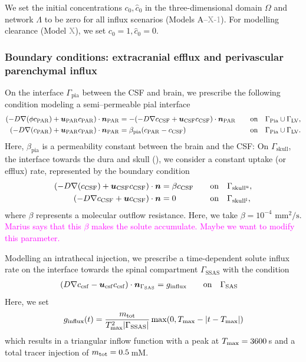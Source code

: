 \documentclass[fleqn,10pt]{wlscirep}
\newcommand{\mer}[1]{\textcolor{magenta}{#1}}
\newcommand{\draft}[1]{\textcolor{gray}{#1}}
\newcommand{\pia}{\Gamma_{\rm{Pia}}}
\newcommand{\spinal}{\Gamma_{\rm SAS}}
\begin{document}
We set the initial concentrations $c_0, \hat{c}_0$ in the three-dimensional domain $\Omega$ and network $\Lambda$ to be zero for all influx scenarios (Models A--\draft{X-1}). For modelling clearance (Model \draft{X}), we set $c_0 = 1, \hat{c}_0 = 0$.

\subsubsection*{Boundary conditions: extracranial efflux and perivascular parenchymal influx}
On the interface $\Gamma_{\mathrm{pia}}$ between the CSF and brain, we prescribe the following condition modeling a semi--permeable pial interface 
\begin{alignat}{2}
(-D \nabla (\phi c_{\rm{PAR}}) + \bm u_{\rm{PAR}} c_{\rm{PAR} }) \cdot \bm{n}_{\rm{PAR}} &= - (- D \nabla c_{\rm{CSF}} + \bm u_{\rm{CSF}} c_{\rm{CSF}} ) \cdot \bm{n}_{\rm{PAR}} &&  \quad  \mathrm{on} \quad \pia \cup \Gamma_{\mathrm{LV}} ,  \\  
(-D \nabla ( c_{\rm{PAR}}) + \bm u_{\rm{PAR}} c_{\rm{PAR} }) \cdot \bm{n}_{\rm{PAR}} & = \beta_{\rm{pia}} (c_{\rm PAR} - c_{\mathrm{CSF}}) &&  \quad  \mathrm{on} \quad  \pia \cup \Gamma_{\mathrm{LV}} .  
\end{alignat} 
Here, $\beta_{\mathrm{pia}}$ is a permeability constant between the brain and the CSF: On $\Gamma_{\mathrm{skull}}$, the interface towards the dura and skull (), we consider a constant uptake (or efflux) rate, represented by the boundary condition 
\begin{alignat}{2}
(- D \nabla ( c_{\mathrm{CSF}}) + \bm u_{\mathrm{CSF}} c_{\mathrm{CSF}}) \cdot \bm{n}   & = \beta c_{\mathrm{CSF}}  && \quad \mathrm{on} \quad \Gamma_{\mathrm{skull}^{\rm u}},\\ 
(-D \nabla c_{\rm CSF} + \bm u c_{\rm CSF}) \cdot \bm{n} & =  0   &&  \quad  \mathrm{on} \quad \Gamma_{\rm skull^{l}} , 
\end{alignat}
where $\beta$ represents a molecular outflow resistance. Here, we take $\beta = 10^{-4} \,\, \mathrm{mm}^2/\mathrm{s}$\cite{hornkjol2022csf}.
\mer{Marius says that this $\beta$ makes the solute accumulate. Maybe we want to modify this parameter.}

Modelling an intrathecal injection, we prescribe a time-dependent solute influx rate on the interface towards the spinal compartment $\Gamma_{\mathrm{SSAS}}$
with the condition 
\begin{alignat}{2}
    (D \nabla  c_{\mathrm{csf}} - \bm u_{\mathrm{csf}}c_{\mathrm{csf}} ) \cdot \bm{n}_{\spinal} & = g_{\mathrm{influx}} &&   \quad  \mathrm{on} \quad \spinal  \end{alignat}
Here, we set
\begin{equation}
g_\mathrm{influx}(t) = \frac{m_{\rm tot}}{T_{\rm max}^2 |\Gamma_{\rm SSAS}|} \max(0, T_{\rm max} - |t - T_{\rm max}|)
\end{equation}
which results in a triangular inflow function with a peak at $T_{\rm max} = 3600\,$s and a total tracer injection of $m_{\rm tot} = 0.5$\,mM.
\end{document}
